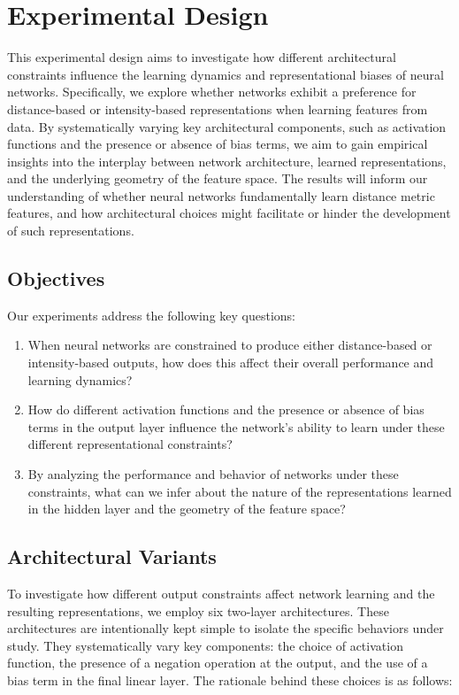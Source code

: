 \section{Experimental Design}
\label{sec:exp_design}

This experimental design aims to investigate how different architectural constraints influence the learning dynamics and representational biases of neural networks. Specifically, we explore whether networks exhibit a preference for distance-based or intensity-based representations when learning features from data. By systematically varying key architectural components, such as activation functions and the presence or absence of bias terms, we aim to gain empirical insights into the interplay between network architecture, learned representations, and the underlying geometry of the feature space. The results will inform our understanding of whether neural networks fundamentally learn distance metric features, and how architectural choices might facilitate or hinder the development of such representations.

\subsection{Objectives}
Our experiments address the following key questions:
\begin{enumerate}
    \item When neural networks are constrained to produce either distance-based or intensity-based outputs, how does this affect their overall performance and learning dynamics?
    \item How do different activation functions and the presence or absence of bias terms in the output layer influence the network's ability to learn under these different representational constraints?
    \item By analyzing the performance and behavior of networks under these constraints, what can we infer about the nature of the representations learned in the hidden layer and the geometry of the feature space?
\end{enumerate}

\subsection{Architectural Variants}To investigate how different output constraints affect network learning and the resulting representations, we employ six two-layer architectures. These architectures are intentionally kept simple to isolate the specific behaviors under study. They systematically vary key components: the choice of activation function, the presence of a negation operation at the output, and the use of a bias term in the final linear layer. The rationale behind these choices is as follows:

